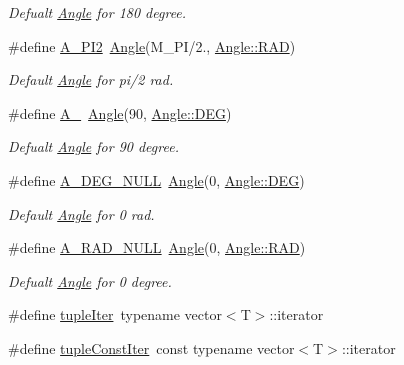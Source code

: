 \begin{DoxyCompactItemize}
\begin{DoxyCompactList}\small\item\em Defualt \mbox{\hyperlink{class_angle}{Angle}} for 180 degree. \end{DoxyCompactList}\item 
\#define \mbox{\hyperlink{maths_8hh_a73d408ce54489e86b860679af5d24059}{A\+\_\+\+P\+I2}}~\mbox{\hyperlink{class_angle}{Angle}}(M\+\_\+\+PI/2., \mbox{\hyperlink{class_angle_a4f7b9849ce8780bcba95ca3ee45cff77a93ab6b68075fd7a6fe724fbde5b13c1f}{Angle\+::\+R\+AD}})
\begin{DoxyCompactList}\small\item\em Default \mbox{\hyperlink{class_angle}{Angle}} for pi/2 rad. \end{DoxyCompactList}\item 
\#define \mbox{\hyperlink{maths_8hh_ae49ec00d228075202319f793f89e39b5}{A\+\_}}~\mbox{\hyperlink{class_angle}{Angle}}(90, \mbox{\hyperlink{class_angle_a4f7b9849ce8780bcba95ca3ee45cff77a65e2aa4bc05730c9c2e8fdaf73612282}{Angle\+::\+D\+EG}})
\begin{DoxyCompactList}\small\item\em Defualt \mbox{\hyperlink{class_angle}{Angle}} for 90 degree. \end{DoxyCompactList}\item 
\#define \mbox{\hyperlink{maths_8hh_abc6a1d62385f5e3f01509c97666fbbbb}{A\+\_\+\+D\+E\+G\+\_\+\+N\+U\+LL}}~\mbox{\hyperlink{class_angle}{Angle}}(0, \mbox{\hyperlink{class_angle_a4f7b9849ce8780bcba95ca3ee45cff77a65e2aa4bc05730c9c2e8fdaf73612282}{Angle\+::\+D\+EG}})
\begin{DoxyCompactList}\small\item\em Default \mbox{\hyperlink{class_angle}{Angle}} for 0 rad. \end{DoxyCompactList}\item 
\#define \mbox{\hyperlink{maths_8hh_a0da7d22251afe9ccf02289e0bceca28f}{A\+\_\+\+R\+A\+D\+\_\+\+N\+U\+LL}}~\mbox{\hyperlink{class_angle}{Angle}}(0, \mbox{\hyperlink{class_angle_a4f7b9849ce8780bcba95ca3ee45cff77a93ab6b68075fd7a6fe724fbde5b13c1f}{Angle\+::\+R\+AD}})
\begin{DoxyCompactList}\small\item\em Defualt \mbox{\hyperlink{class_angle}{Angle}} for 0 degree. \end{DoxyCompactList}\item 
\#define \mbox{\hyperlink{maths_8hh_ad22dcdeefda7d41523cc1604953eb6cc}{tuple\+Iter}}~typename vector$<$T$>$\+::iterator
\item 
\#define \mbox{\hyperlink{maths_8hh_a2eba794860251c1b30e532df32ee4d1b}{tuple\+Const\+Iter}}~const typename vector$<$T$>$\+::iterator
\end{DoxyCompactItemize}
